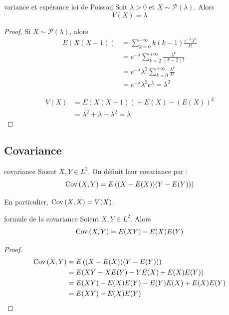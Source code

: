 \begin{proposition}{variance et espérance loi de Poisson}{}
    Soit $\lambda > 0$ et $X \sim \mathcal P(\lambda)$. Alors 
    $$ V(X) = \lambda $$
\end{proposition}

\begin{proof}
    Si $X \sim \mathcal P(\lambda)$, alors 
    \begin{align}
        E(X(X - 1)) & = \sum_{k = 0}^{+ \infty} k (k - 1) \frac{e^{- \lambda} \lambda^k}{k!} \\
        & = e^{- \lambda} \sum_{k = 2}^{+ \infty} \frac{\lambda^k}{(k - 2)!} \\
        & = e^{- \lambda} \lambda^2 \sum_{k = 0}^{+ \infty} \frac{\lambda^k}{k!} \\
        & = e^{- \lambda} \lambda^2 e^{\lambda} = \lambda^2
    \end{align}

    \begin{align}
        V(X) & = E(X(X - 1)) + E(X) - (E(X))^2 \\
        & = \lambda^2 + \lambda - \lambda^2 = \lambda
    \end{align}
\end{proof}

\subsection{Covariance }

\begin{definition}{covariance}{}
    Soient $X, Y \in L^2$. On définit leur covariance par : 
    $$ \operatorname{Cov} \,(X, Y) = E\left( (X - E(X))(Y - E(Y)) \right) $$

    En particulier, $\operatorname{Cov} \,(X, X) = V(X)$.
\end{definition}

\begin{proposition}{formule de la covariance}{}
    Soient $X, Y \in L^2$. Alors 
    $$ \operatorname{Cov} \,(X, Y) = E(XY) - E(X) E(Y) $$
\end{proposition}

\begin{proof}
    \begin{align}
        \operatorname{Cov} \,(X, Y) & = E\left( (X - E(X))(Y - E(Y)) \right) \\
        & = E(XY - X E(Y) - Y E(X) + E(X) E(Y)) \\
        & = E(XY) - E(X) E(Y) - E(Y) E(X) + E(X) E(Y) \\
        & = E(XY) - E(X) E(Y)
    \end{align}
\end{proof}

